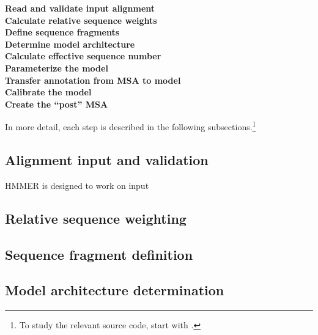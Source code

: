 \begin{description}

\item [\textbf{Read and validate input alignment}]

\item [\textbf{Calculate relative sequence weights}]

\item [\textbf{Define sequence fragments}]

\item [\textbf{Determine model architecture}]

\item [\textbf{Calculate effective sequence number}]

\item [\textbf{Parameterize the model}]

\item [\textbf{Transfer annotation from MSA to model}]

\item [\textbf{Calibrate the model}]

\item [\textbf{Create the ``post'' MSA}]

\end{description}

In more detail, each step is described in the following
subsections.\footnote{To study the relevant source code, start with
  .}


\subsection{Alignment input and validation}

HMMER is designed to work on input 


\subsection{Relative sequence weighting}

\subsection{Sequence fragment definition}

\subsection{Model architecture determination}

